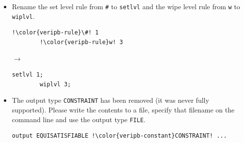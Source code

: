 \documentclass[a4paper]{article}
\newcommand{\veriPB}[0]{\textsc{VeriPB}}
\begin{document}
\begin{itemize}
	      \begin{minipage}[t]{.05\linewidth}
		      \centering \vspace*{-5mm}$\to$
	      \end{minipage}\hfill%
	      \hfill%
	      \begin{minipage}{.47\linewidth}
		      \begin{lstlisting}[language=veripb, gobble=8, rulecolor=\color{veripb-valid-text}, caption={\veriPB{} 3.0 syntax.}]
		pol 1 2 +;
		rup +1 x1 >= 0;
		del 42;
		solx ~x1 x2 x3;
		soli ~x1 x2 x3;
		def_order
			...
		end;
		\end{lstlisting}
	      \end{minipage}
	\item Rename the set level rule from \verb!#! to \verb!setlvl! and the wipe level rule from \verb!w! to \verb!wiplvl!.
	      \\[1mm]
	      \begin{minipage}{.47\linewidth}
		      \begin{lstlisting}[language=veripb, gobble=8, rulecolor=\color{veripb-invalid-text}, caption={\veriPB{} 2.0 syntax.}]
		!\color{veripb-rule}\#! 1
		!\color{veripb-rule}w! 3
		\end{lstlisting}
	      \end{minipage}\hfill%
	      \begin{minipage}[t]{.05\linewidth}
		      \centering \vspace*{-5mm}$\to$
	      \end{minipage}\hfill%
	      \hfill%
	      \begin{minipage}{.47\linewidth}
		      \begin{lstlisting}[language=veripb, gobble=8, rulecolor=\color{veripb-valid-text}, caption={\veriPB{} 3.0 syntax.}]
		setlvl 1;
		wiplvl 3;
		\end{lstlisting}
	      \end{minipage}
	\item The output type {\color{veripb-constant}\verb!CONSTRAINT!} has been removed (it was never fully supported). Please write the contents to a file, specify that filename on the command line and use the output type \lstinline[language=veripb]!FILE!.
	      \\[1mm]
	      \begin{minipage}{.47\linewidth}
		      \begin{lstlisting}[language=veripb, gobble=8, rulecolor=\color{veripb-invalid-text}, caption={\veriPB{} 2.0 syntax.}]
		output EQUISATISFIABLE !\color{veripb-constant}CONSTRAINT! ...

\end{lstlisting}
\end{minipage}
\end{itemize}
\end{document}
